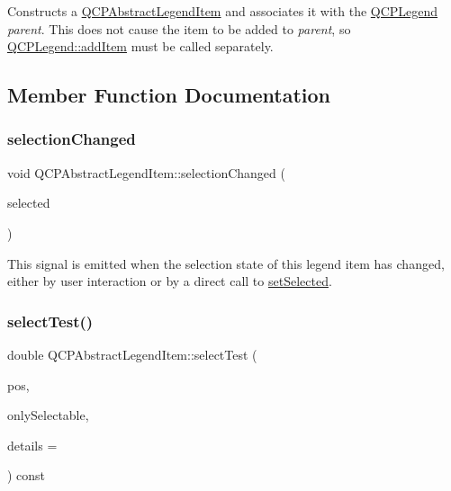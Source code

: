 Constructs a \hyperlink{classQCPAbstractLegendItem}{Q\+C\+P\+Abstract\+Legend\+Item} and associates it with the \hyperlink{classQCPLegend}{Q\+C\+P\+Legend} {\itshape parent}. This does not cause the item to be added to {\itshape parent}, so \hyperlink{classQCPLegend_a3ab274de52d2951faea45a6d975e6b3f}{Q\+C\+P\+Legend\+::add\+Item} must be called separately. 

\subsection{Member Function Documentation}
\mbox{\label{classQCPAbstractLegendItem_a7cb61fdfbaf69c590bacb8f9e7099d9e}} 
\subsubsection{\texorpdfstring{selection\+Changed}{selectionChanged}}
{\footnotesize\ttfamily void Q\+C\+P\+Abstract\+Legend\+Item\+::selection\+Changed (\begin{DoxyParamCaption}\item[{bool}]{selected }\end{DoxyParamCaption})\hspace{0.3cm}{\ttfamily [signal]}}

This signal is emitted when the selection state of this legend item has changed, either by user interaction or by a direct call to \hyperlink{classQCPAbstractLegendItem_a6eed93b0ab99cb3eabb043fb08179c2b}{set\+Selected}. \mbox{\label{classQCPAbstractLegendItem_a80ec112a6608fc39dbed56239849b187}} 
\subsubsection{\texorpdfstring{select\+Test()}{selectTest()}}
{\footnotesize\ttfamily double Q\+C\+P\+Abstract\+Legend\+Item\+::select\+Test (\begin{DoxyParamCaption}\item[{const Q\+PointF \&}]{pos,  }\item[{bool}]{only\+Selectable,  }\item[{Q\+Variant $\ast$}]{details = {} }\end{DoxyParamCaption}) const\hspace{0.3cm}{\ttfamily [virtual]}}

